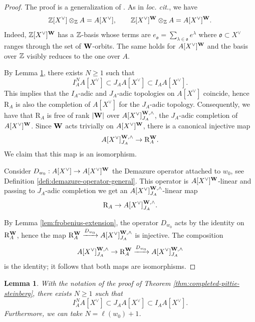 \documentclass[a4paper, 10pt, oneside, reqno]{amsart}
\theoremstyle{plain}
\newtheorem{lem}[thm]{Lemma}
\theoremstyle{definition}
\theoremstyle{remark}
\newcommand{\RR}{\mathrm{R}}
\newcommand{\ofrak}{\mathfrak{o}}
\begin{document}
\begin{proof}
The proof is a generalization of \cite[Theorem 8.1]{BezrukavnikovRiche}. As in \emph{loc. cit.}, we have 
$$\mathbb{Z}[X^{\vee}] \otimes_{\mathbb{Z}} A = A[X^{\vee}], \qquad \mathbb{Z}[X^{\vee}]^{\mathbf{W}} \otimes_{\mathbb{Z}} A = A[X^{\vee}]^{\mathbf{W}}.$$
Indeed, $\mathbb{Z}[X^{\vee}]^{\mathbf{W}}$ has a $\mathbb{Z}$-basis whose terms are $e_{\ofrak} = \sum_{\lambda \in \ofrak} e^{\lambda}$ where $\ofrak \subset X^{\vee}$ ranges through the set of $\mathbf{W}$-orbits. The same holds for $A[X^{\vee}]^{\mathbf{W}}$ and the basis over $\mathbb{Z}$ visibly reduces to the one over $A$. 

By Lemma \ref{lem:comparison-of-topologies}, there exists $N \geq 1$ such that 
$$I_A^NA[X^{\vee}] \subset J_AA[X^{\vee}] \subset I_AA[X^{\vee}].$$
This implies that the $I_A$-adic and $J_A$-adic topologies on $A[X^{\vee}]$ coincide, hence $\RR_A$ is also the completion of $A[X^{\vee}]$ for the $J_A$-adic topology. Consequently, we have that $\RR_A$ is free of rank $|\mathbf{W}|$ over $A[X^{\vee}]^{\mathbf{W}, \wedge}_{J_A}$, the $J_A$-adic completion of $A[X^{\vee}]^{\mathbf{W}}$. Since $\mathbf{W}$ acts trivially on $A[X^{\vee}]^{\mathbf{W}}$, there is a canonical injective map 
$$A[X^{\vee}]^{\Wbf,\wedge}_{J_A} \to \RR_A^{\Wbf}.$$
We claim that this map is an isomorphism. 

Consider $D_{w_0} : A[X^{\vee}] \to A[X^{\vee}]^{\mathbf{W}}$ the Demazure operator attached to $w_0$, see Definition \ref{defi:demazure-operator-general}. This operator is $A[X^{\vee}]^{\mathbf{W}}$-linear and passing to $J_A$-adic completion we get an $A[X^{\vee}]^{\mathbf{W}, \wedge}_{J_A}$-linear map
$$\RR_A \to A[X^{\vee}]^{\Wbf, \wedge}_{J_A}.$$

By Lemma \ref{lem:frobenius-extension}, the operator $D_{w_0}$ acts by the identity on $\RR_A^{\Wbf}$, hence the map $\RR_A^{\Wbf} \xrightarrow{D_{w_0}} A[X^{\vee}]^{\Wbf, \wedge}_{J_A}$ is injective. The composition 
$$A[X^{\vee}]^{\Wbf, \wedge}_{J_A} \to \RR_A^{\Wbf} \xrightarrow{D_{w_0}} A[X^{\vee}]^{\Wbf, \wedge}_{J_A}$$
is the identity; it follows that both maps are isomorphisms.
\end{proof}

\begin{lem}\label{lem:comparison-of-topologies}
With the notation of the proof of Theorem \ref{thm:completed-pittie-steinberg}, there exists $N \geq 1$ such that 
$$I_A^NA[X^{\vee}] \subset J_AA[X^{\vee}] \subset I_AA[X^{\vee}].$$ 
Furthermore, we can take $N = \ell(w_0)+1$. 
\end{lem}
\end{document}
